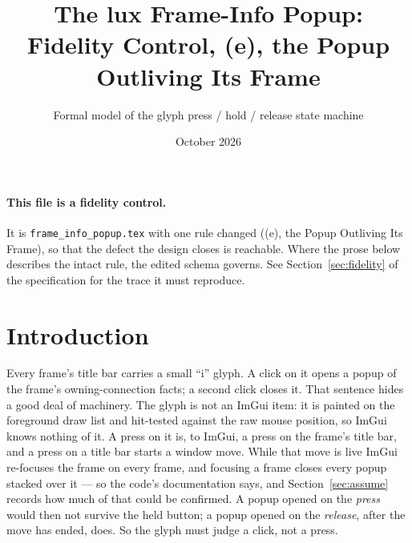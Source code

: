 \documentclass[a4paper,10pt,fleqn]{article}
\begin{document}
\title{The lux Frame-Info Popup: Fidelity Control, (e), the Popup Outliving Its Frame}
\author{Formal model of the glyph press / hold / release state machine}
\date{October 2026}
\maketitle

\paragraph{This file is a fidelity control.}
It is \texttt{frame\_info\_popup.tex} with one rule changed ((e), the Popup Outliving Its Frame), so that
the defect the design closes is reachable.  Where the prose below describes
the intact rule, the edited schema governs.  See Section~\ref{sec:fidelity} of
the specification for the trace it must reproduce.

\section{Introduction}

Every frame's title bar carries a small ``i'' glyph.  A click on it opens a
popup of the frame's owning-connection facts; a second click closes it.  That
sentence hides a good deal of machinery.  The glyph is not an ImGui item: it is
painted on the foreground draw list and hit-tested against the raw mouse
position, so ImGui knows nothing of it.  A press on it is, to ImGui, a press on
the frame's title bar, and a press on a title bar starts a window move.  While
that move is live ImGui re-focuses the frame on every frame, and focusing a
frame closes every popup stacked over it --- so the code's documentation says,
and Section~\ref{sec:assume} records how much of that could be confirmed.  A
popup opened on the \emph{press} would then not survive the held button; a
popup opened on the \emph{release}, after the move has ended, does.  So the glyph
must judge a click, not a press.
\end{document}
